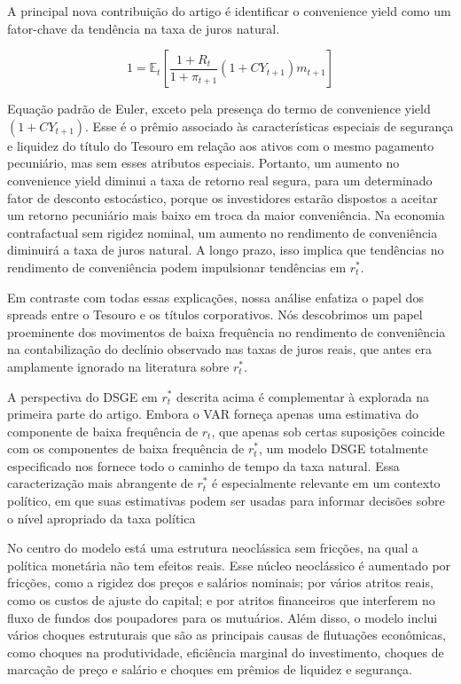 A principal nova contribuição do artigo é identificar o convenience yield como um fator-chave da tendência na taxa de juros natural.

$$1 = \mathbb{E}_t \left[\dfrac{1 + R_t}{1 + \pi_{t+1}}(1 + CY_{t+1})m_{t+1}  \right] $$

Equação padrão de Euler, exceto pela presença do termo de convenience yield $(1 + CY_{t+1})$. Esse é o prêmio associado às características especiais de segurança e liquidez do título do Tesouro em relação aos ativos com o mesmo pagamento pecuniário, mas sem esses atributos especiais. Portanto, um aumento no convenience yield diminui a taxa de retorno real segura, para um determinado fator de desconto estocástico, porque os investidores estarão dispostos a aceitar um retorno pecuniário mais baixo em troca da maior conveniência. Na economia contrafactual sem rigidez nominal, um aumento no rendimento de conveniência diminuirá a taxa de juros natural. A longo prazo, isso implica que tendências no rendimento de conveniência podem impulsionar tendências em $r_{t}^{*}$.

Em contraste com todas essas explicações, nossa análise enfatiza o papel dos spreads entre o Tesouro e os títulos corporativos. Nós descobrimos um papel proeminente dos movimentos de baixa frequência no rendimento de conveniência na contabilização do declínio observado nas taxas de juros reais, que antes era amplamente ignorado na literatura sobre $r_{t}^{*}$.

A perspectiva do DSGE em $r_{t}^{*}$ descrita acima é complementar à explorada na primeira parte do artigo. Embora o VAR forneça apenas uma estimativa do componente de baixa frequência de $r_{t}$, que apenas sob certas suposições coincide com os componentes de baixa frequência de $r_{t}^{*}$, um modelo DSGE totalmente especificado nos fornece todo o caminho de tempo da taxa natural. Essa caracterização mais abrangente de $r_{t}^{*}$ é especialmente relevante em um contexto político, em que suas estimativas podem ser usadas para informar decisões sobre o nível apropriado da taxa política

No centro do modelo está uma estrutura neoclássica sem fricções, na qual a política monetária não tem efeitos reais. Esse núcleo neoclássico é aumentado por fricções, como a rigidez dos preços e salários nominais; por vários atritos reais, como os custos de ajuste do capital; e por atritos financeiros que interferem no fluxo de fundos dos poupadores para os mutuários. Além disso, o modelo inclui vários choques estruturais que são as principais causas de flutuações econômicas, como choques na produtividade, eficiência marginal do investimento, choques de marcação de preço e salário e choques em prêmios de liquidez e segurança.


